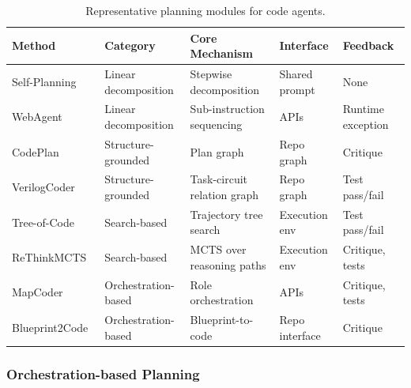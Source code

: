\begin{table}[t]
\centering
\caption{Representative planning modules for code agents.}
\label{tab:planning_modules}
\renewcommand{\arraystretch}{1.12}
\setlength{\tabcolsep}{3pt}
\footnotesize
\begin{tabularx}{\textwidth}{@{}llllX@{}}
\toprule
\textbf{Method} & \textbf{Category} & \textbf{Core Mechanism} & \textbf{Interface} & \textbf{Feedback} \\
\midrule
Self-Planning~\cite{jiang2024selfplanning}
& Linear decomposition
& Stepwise decomposition
& Shared prompt
& None \\
WebAgent~\cite{gur2023webagent}
& Linear decomposition
& Sub-instruction sequencing
& APIs
& Runtime exception \\
CodePlan~\cite{bairi2024codeplan}
& Structure-grounded
& Plan graph
& Repo graph
& Critique \\
VerilogCoder~\cite{ho2025verilogcoder}
& Structure-grounded
& Task-circuit relation graph
& Repo graph
& Test pass/fail \\
Tree-of-Code~\cite{ni2024treeofcode}
& Search-based
& Trajectory tree search
& Execution env
& Test pass/fail \\
ReThinkMCTS~\cite{li2025rethinkmcts}
& Search-based
& MCTS over reasoning paths
& Execution env
& Critique, tests \\
MapCoder~\cite{islam2024mapcoder}
& Orchestration-based
& Role orchestration
& APIs
& Critique, tests \\
Blueprint2Code~\cite{mao2025blueprint2code}
& Orchestration-based
& Blueprint-to-code
& Repo interface
& Critique \\
\bottomrule
\end{tabularx}
\end{table}



\subsubsection{Orchestration-based Planning}


